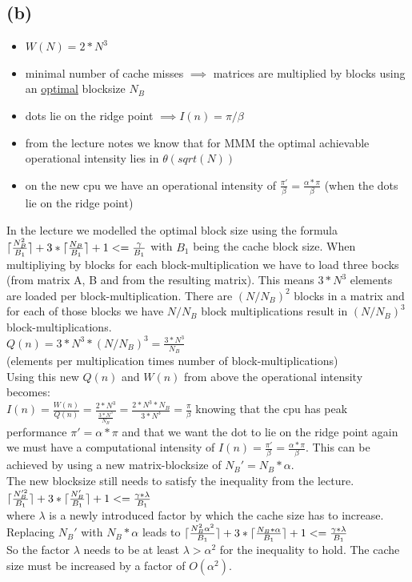 \documentclass[10pt,a4paper,oneside,notitlepage]{report}
\DeclarePairedDelimiter{\ceil}{\lceil}{\rceil}
\begin{document}
\subsection*{(b)}
\begin{itemize}
\item $W(N) = 2*N^3$
\item minimal number of cache misses $\implies$ matrices are multiplied by blocks using an \underline{optimal} blocksize $N_B$ 
\item dots lie on the ridge point $\implies I(n) = \pi/\beta$ 
\item from the lecture notes we know that for MMM the optimal achievable operational intensity lies in $\theta(sqrt(N))$
\item on the new cpu we have an operational intensity of $\frac{\pi'}{\beta}=\frac{\alpha*\pi}{\beta}$ (when the dots lie on the ridge point)
\end{itemize}
In the lecture we modelled the optimal block size using the formula $\ceil{\frac{N_B^2}{B_1}} + 3*\ceil{\frac{N_B}{B_1}} + 1 <= \frac{\gamma}{B_1}$ with $B_1$ being the cache block size. When multipliying by blocks for each block-multiplication we have to load three bocks (from matrix A, B and from the resulting matrix). This means $3*N^3$ elements are loaded per block-multiplication. There are $(N/N_B)^2$ blocks in a matrix and for each of those blocks we have $N/N_B$ block multiplications result in $(N/N_B)^3$ block-multiplications.\\
$Q(n)={3*N^3 * (N/N_B)^3}=\frac{3*N^3}{N_B}$ \\ (elements per multiplication times number of block-multiplications) \\
Using this new $Q(n)$ and $W(n)$ from above the operational intensity becomes: \\ $I(n)=\frac{W(n)}{Q(n)}=\frac{2*N^3}{\frac{3*N^3}{N_B}} = \frac{2*N^3*N_B}{3*N^3} =\frac{\pi}{\beta}$
knowing that the cpu has peak performance $\pi'=\alpha*\pi$ and that we want the dot to lie on the ridge point again we must have a computational intensity of $I(n)=\frac{\pi'}{\beta} = \frac{\alpha*\pi}{\beta}$. This can be achieved by using a new matrix-blocksize of $N_B'=N_B*\alpha$. \\
The new blocksize still needs to satisfy the inequality from the lecture. \\
$\ceil{\frac{N_B'^2}{B_1}} + 3*\ceil{\frac{N_B'}{B_1}} + 1 <= \frac{\gamma*\lambda}{B_1}$ \\
where $\lambda$ is a newly introduced factor by which the cache size has to increase. \\
Replacing $N_B'$ with $N_B*\alpha$ leads to
$\ceil{\frac{N_B^2\alpha^2}{B_1}} + 3*\ceil{\frac{N_B*\alpha}{B_1}} + 1 <= \frac{\gamma*\lambda}{B_1}$ \\
So the factor $\lambda$ needs to be at least $\lambda>\alpha^2$ for the inequality to hold. The cache size must be increased by a factor of $O(\alpha^2)$.
\end{document}
